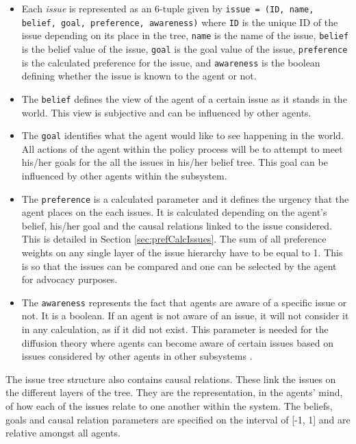 \documentclass[11pt]{article}
\begin{document}
\begin{itemize}
\item Each \emph{issue} is represented as an 6-tuple given by \texttt{issue = (ID, name, belief, goal, preference, awareness)} where
\texttt{ID} is the unique ID of the issue depending on its place in the tree,
\texttt{name} is the name of the issue,  
\texttt{belief} is the belief value of the issue, 
\texttt{goal} is the goal value of the issue, 
\texttt{preference} is the calculated preference for the issue, and
\texttt{awareness} is the boolean defining whether the issue is known to the agent or not.

\item The \texttt{belief} defines the view of the agent of a certain issue as it stands in the world. This view is subjective and can be influenced by other agents.

\item The \texttt{goal} identifies what the agent would like to see happening in the world. All actions of the agent within the policy process will be to attempt to meet his/her goals for the all the issues in his/her belief tree. This goal can be influenced by other agents within the subsystem.

\item The \texttt{preference} is a calculated parameter and it defines the urgency that the agent places on the each issues. It is calculated depending on the agent's belief, his/her goal and the causal relations linked to the issue considered. This is detailed in Section \ref{sec:prefCalcIssues}. The sum of all preference weights on any single layer of the issue hierarchy have to be equal to 1. This is so that the issues can be compared and one can be selected by the agent for advocacy purposes.

\item The \texttt{awareness} represents the fact that agents are aware of a specific issue or not. It is a boolean. If an agent is not aware of an issue, it will not consider it in any calculation, as if it did not exist. This parameter is needed for the diffusion theory where agents can become aware of certain issues based on issues considered by other agents in other subsystems \citep{berry1999innovation}.

\end{itemize}

The issue tree structure also contains causal relations. These link the issues on the different layers of the tree. They are the representation, in the agents' mind, of how each of the issues relate to one another within the system. The beliefs, goals and causal relation parameters are specified on the interval of [-1, 1] and are relative amongst all agents.
\end{document}
